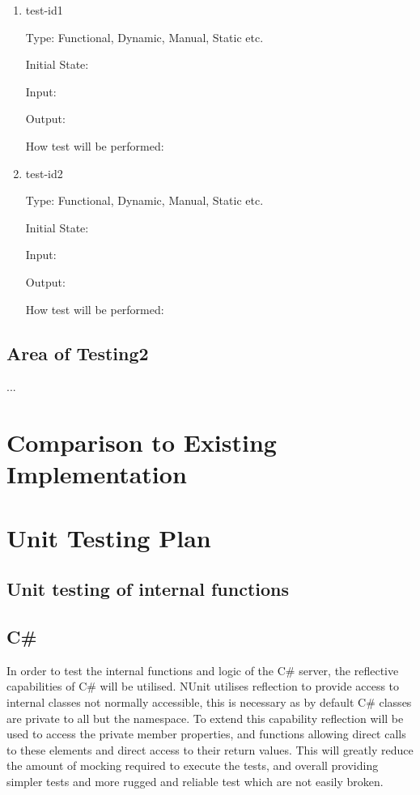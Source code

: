 \documentclass[12pt, titlepage]{article}
\begin{document}
\begin{enumerate}

\item{test-id1\\}

Type: Functional, Dynamic, Manual, Static etc.
					
Initial State: 
					
Input: 
					
Output: 
					
How test will be performed: 
					
\item{test-id2\\}

Type: Functional, Dynamic, Manual, Static etc.
					
Initial State: 
					
Input: 
					
Output: 
					
How test will be performed: 

\end{enumerate}

\subsection{Area of Testing2}

...

	
\section{Comparison to Existing Implementation}	
				
\section{Unit Testing Plan}
		
\subsection{Unit testing of internal functions}

\subsection{C#}
In order to test the internal functions and logic of the C# server, 
the reflective capabilities of C# will be utilised. NUnit utilises 
reflection to provide access to internal classes not normally accessible, 
this is necessary as by default C# classes are private to all but the 
namespace. To extend this capability reflection will be used to access 
the private member properties, and functions allowing direct calls to these 
elements and direct access to their return values. This will greatly reduce 
the amount of mocking required to execute the tests, and overall providing 
simpler tests and more rugged and reliable test which are not easily broken. 
\end{document}
